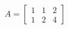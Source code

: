 \documentclass[preview]{standalone}
\begin{document}
\begin{align*}
A=\left[\begin{matrix}1&1&2\\1&2&4\end{matrix}\right]
\end{align*}
\end{document}
